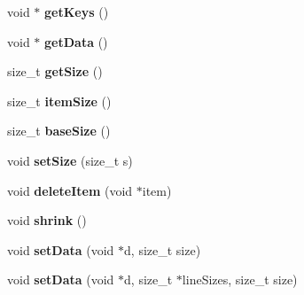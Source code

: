 \begin{DoxyCompactItemize}
\item 
\hypertarget{classfaster_1_1workerFdd_a848160e2971c286c7a3aad710dd0b9fb}{}void $\ast$ {\bfseries get\+Keys} ()\label{classfaster_1_1workerFdd_a848160e2971c286c7a3aad710dd0b9fb}

\item 
\hypertarget{classfaster_1_1workerFdd_a91445867b8280e20301e6e07e7afc6b2}{}void $\ast$ {\bfseries get\+Data} ()\label{classfaster_1_1workerFdd_a91445867b8280e20301e6e07e7afc6b2}

\item 
\hypertarget{classfaster_1_1workerFdd_acdedac95179fa5a2c4b88fb9c250acd6}{}size\+\_\+t {\bfseries get\+Size} ()\label{classfaster_1_1workerFdd_acdedac95179fa5a2c4b88fb9c250acd6}

\item 
\hypertarget{classfaster_1_1workerFdd_aac8ebab407dd4c0024700bb2ab7601d7}{}size\+\_\+t {\bfseries item\+Size} ()\label{classfaster_1_1workerFdd_aac8ebab407dd4c0024700bb2ab7601d7}

\item 
\hypertarget{classfaster_1_1workerFdd_a2e60538a409f44fa5fdaadcd9960508a}{}size\+\_\+t {\bfseries base\+Size} ()\label{classfaster_1_1workerFdd_a2e60538a409f44fa5fdaadcd9960508a}

\item 
\hypertarget{classfaster_1_1workerFdd_a1688e263591a30c9a715df234af3a631}{}void {\bfseries set\+Size} (size\+\_\+t s)\label{classfaster_1_1workerFdd_a1688e263591a30c9a715df234af3a631}

\item 
\hypertarget{classfaster_1_1workerFdd_ab25cae53f4ba6d2b5fbd9c0e7e1cbe06}{}void {\bfseries delete\+Item} (void $\ast$item)\label{classfaster_1_1workerFdd_ab25cae53f4ba6d2b5fbd9c0e7e1cbe06}

\item 
\hypertarget{classfaster_1_1workerFdd_ab38a9a23eff8164ce9b5c7e2bb617f99}{}void {\bfseries shrink} ()\label{classfaster_1_1workerFdd_ab38a9a23eff8164ce9b5c7e2bb617f99}

\item 
\hypertarget{classfaster_1_1workerFdd_ae22b78af425a3d3fb21af154614e8b20}{}void {\bfseries set\+Data} (void $\ast$d, size\+\_\+t size)\label{classfaster_1_1workerFdd_ae22b78af425a3d3fb21af154614e8b20}

\item 
\hypertarget{classfaster_1_1workerFdd_aeb6300f2d679b6b44693516d821c2b96}{}void {\bfseries set\+Data} (void $\ast$d, size\+\_\+t $\ast$line\+Sizes, size\+\_\+t size)\label{classfaster_1_1workerFdd_aeb6300f2d679b6b44693516d821c2b96}


\end{DoxyCompactItemize}
